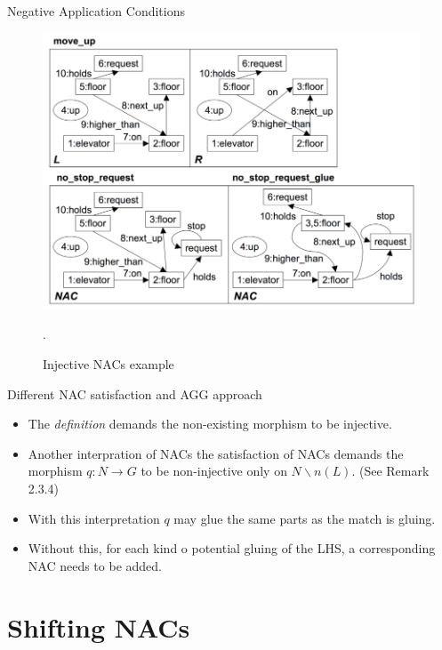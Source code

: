 \documentclass[xcolor=dvipsnames,pdf,10pt]{beamer}
\begin{document}
\begin{frame}[allowframebreaks]{Negative Application Conditions}
\begin{figure}[htbp]
\centering
\includegraphics[width=1\textwidth]{fig/injective-nac-example.png}
\caption{\label{fig:shift-right-to-left} Injective NACs example}.
\end{figure}

\end{frame}

\begin{frame}[allowframebreaks]{Different NAC satisfaction and AGG approach}

\begin{itemize}
\item The \emph{definition} demands the non-existing morphism to be injective.
\item Another interpration of NACs the satisfaction of NACs demands the morphism $q: N \rightarrow G$ to be non-injective only on $N \backslash n(L)$. (See Remark 2.3.4)
\item With this interpretation $q$ may glue the same parts as the match is gluing.
\item Without this, for each kind o potential gluing of the LHS, a corresponding NAC needs to be added.

\end{itemize}

\end{frame}


\section{Shifting NACs}
\end{document}
